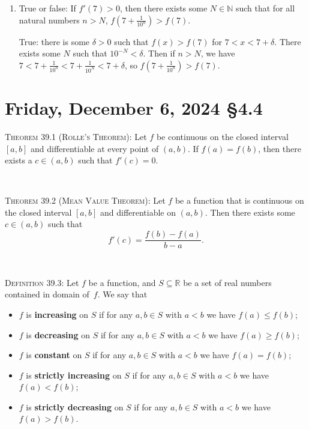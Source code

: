 \documentclass[12pt]{amsart}
\def\Fr{Friday}
\newcommand{\R}{{\mathbb{R}}}
\newcommand{\N}{\mathbb{N}}
\numberwithin{equation}{section}
\theoremstyle{plain} %
\newcommand{\Dec}[3]{\section{#2, December #1, 2024 \quad \S#3}}
\theoremstyle{definition}
\theoremstyle{remark}
\begin{document}
\begin{enumerate}
  \item True or false: If $f'(7)>0$, then there exists some $N\in \N$ such that for all natural numbers $n>N$,  $f\left(7+ \frac{1}{10^n}\right)>f(7)$.
  
\begin{framed}
True: there is some $\delta>0$ such that $f(x)>f(7)$ for $7<x<7+\delta$. There exists some $N$ such that $10^{-N} < \delta$. Then if $n>N$, we have $7< 7+ \frac{1}{10^n} < 7 +  \frac{1}{10^N} < 7+ \delta$, so $f(7+ \frac{1}{10^n}) > f(7)$.
\end{framed}
\end{enumerate}
\newpage
\Dec{6}{\Fr}{4.4}

\begin{framed} 

 \noindent \textsc{Theorem 39.1 (Rolle's Theorem):}  Let $f$ be continuous on the closed interval $[a,b]$ and differentiable at every point of $(a,b)$. If $f(a) = f(b)$, then there exists a $c \in
  (a,b)$ such that $f'(c) = 0$.
  
  
  \
  
 \noindent \textsc{Theorem 39.2 (Mean Value Theorem):} Let $f$ be a function that is continuous on the closed interval $[a,b]$ and differentiable on $(a,b)$. Then there exists some $c\in (a,b)$ such that
 \[ f'(c) = \frac{f(b) - f(a)}{b-a}.\]
 
 \
 
 \noindent \textsc{Definition 39.3:} Let $f$ be a function, and $S\subseteq \R$ be a set of real numbers contained in domain of~$f$. We say that 
\begin{itemize}
\item $f$ is \textbf{increasing} on $S$ if for any $a,b\in S$ with $a<b$ we have $f(a) \leq f(b)$;
\item $f$ is \textbf{decreasing} on $S$ if for any $a,b\in S$ with $a<b$ we have $f(a) \geq f(b)$;
\item $f$ is \textbf{constant} on $S$ if for any $a,b\in S$ with $a<b$ we have $f(a) = f(b)$;
\item  $f$ is \textbf{strictly increasing} on $S$ if for any $a,b\in S$ with $a<b$ we have $f(a) < f(b)$;
\item $f$ is \textbf{strictly decreasing} on $S$ if for any $a,b\in S$ with $a<b$ we have $f(a) > f(b)$.
\end{itemize}


\end{framed}
\end{document}
